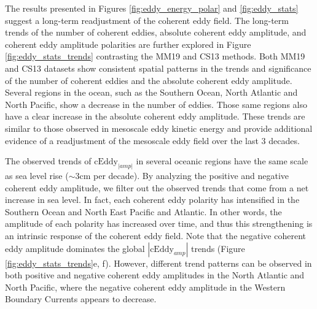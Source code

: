 \documentclass[draft,linenumbers]{agujournal2019}
\newcommand{\cEddy}{\textrm{cEddy}}
\begin{document}
	The results presented in Figures \ref{fig:eddy_energy_polar} and \ref{fig:eddy_stats} suggest a long-term readjustment of the coherent eddy field. 
	The long-term trends of the number of coherent eddies, absolute coherent eddy amplitude, and coherent eddy amplitude polarities are further explored in Figure \ref{fig:eddy_stats_trends} contrasting the MM19 and CS13 methods. 
	Both MM19 and CS13 datasets show consistent spatial patterns in the trends and significance of the number of coherent eddies and the absolute coherent eddy amplitude. 
	Several regions in the ocean, such as the Southern Ocean, North Atlantic and North Pacific, show a decrease in the number of eddies. Those same regions also have a clear increase in the absolute coherent eddy amplitude. 
	These trends are similar to those observed in mesoscale eddy kinetic energy \citep{Martinez_Kinetic_2021} and provide additional evidence of a readjustment of the mesoscale eddy field over the last 3 decades. 

	The observed trends of $\cEddy_{|amp|}$ in several oceanic regions have the same scale as sea level rise ($\sim$3cm per decade). By analyzing the positive and negative coherent eddy amplitude, we filter out the observed trends that come from a net increase in sea level. 
	In fact, each coherent eddy polarity has intensified in the Southern Ocean and North East Pacific and Atlantic. 
	In other words, the amplitude of each polarity has increased over time, and thus this strengthening is an intrinsic response of the coherent eddy field. Note that the negative coherent eddy amplitude dominates the global $|\cEddy_{amp}|$ trends (Figure \ref{fig:eddy_stats_trends}e, f). However, different trend patterns can be observed in both positive and negative coherent eddy amplitudes in the North Atlantic and North Pacific, where the negative coherent eddy amplitude in the  Western Boundary Currents appears to decrease.
\end{document}
